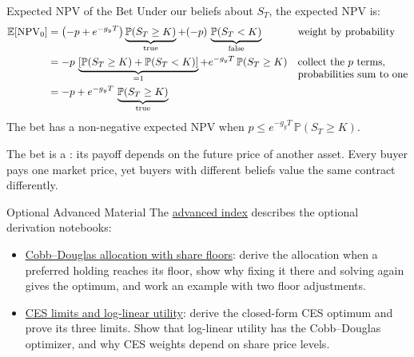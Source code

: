 \documentclass[aspectratio=169,11pt]{beamer}
\newcommand{\E}{\mathbb{E}}
\newcommand{\NPV}{\operatorname{NPV}}
\newcommand{\repo}{https://github.com/varnerlab/CHEME-5660-CourseRepository-Fall-2026/blob/main/lectures/week-8/L8b}
\begin{document}
\begin{frame}{Expected NPV of the Bet}
  Under our beliefs about $S_T$, the expected NPV is:
  {\small
  \[
    \begin{aligned}
      \E[\NPV_0]&=\left(-p+e^{-g_yT}\right)\underbrace{\mathbb{P}(S_T\ge K)}_{\text{true}}+(-p)\,\underbrace{\mathbb{P}(S_T<K)}_{\text{false}} &&\text{weight by probability}\\
      &=-p\,\underbrace{\left[\mathbb{P}(S_T\ge K)+\mathbb{P}(S_T<K)\right]}_{=1}+e^{-g_yT}\,\mathbb{P}(S_T\ge K) &&\begin{tabular}[t]{@{}l@{}}collect the $p$ terms,\\ probabilities sum to one\end{tabular}\\
      &=-p+e^{-g_yT}\,\underbrace{\mathbb{P}(S_T\ge K)}_{\text{true}}
    \end{aligned}
  \]
  }%
  The bet has a non-negative expected NPV when $p\le e^{-g_yT}\,\mathbb{P}(S_T\ge K)$.

  \vspace{0.8em}
  The bet is a : its payoff depends on the future price
  of another asset. Every buyer pays one market price, yet buyers with different
  beliefs value the same contract differently.

  \vspace{0.8em}
  \textbf{}
\end{frame}

\begin{frame}{Optional Advanced Material}
The \href{\repo/advanced/README.md}{advanced index} describes the optional derivation notebooks:
\begin{itemize}\setlength{\itemsep}{1em}
\item \href{\repo/advanced/cobb-douglas-derivation/CHEME-5660-L8b-Derivation-CobbDouglas-Fall-2026.ipynb}{Cobb--Douglas allocation with share floors}:
derive the allocation when a preferred holding reaches its floor, show why fixing
it there and solving again gives the optimum, and work an example with two floor
adjustments.
\item \href{\repo/advanced/adaptive_utility/CHEME-5660-L8b-Advanced-CES-Limits-Fall-2026.ipynb}{CES limits and log-linear utility}:
derive the closed-form CES optimum and prove its three limits. Show that
log-linear utility has the Cobb--Douglas optimizer, and why CES weights depend on
share price levels.
\end{itemize}
\end{frame}
\end{document}
